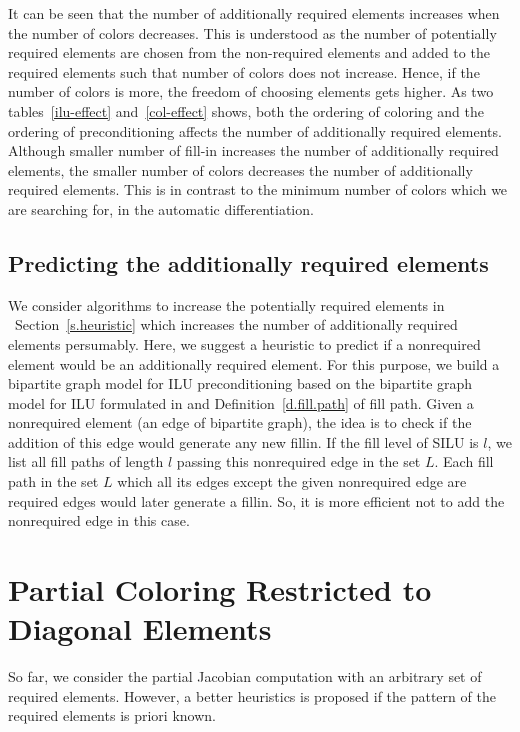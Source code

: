 \documentclass[11pt, twoside,a4paper]{book}
\newcommand{\secref}[1]{Section~\protect\ref{#1}}
\newcommand{\defref}[1]{Definition~\protect\ref{#1}}
\begin{document}
It can be seen that the number of additionally required elements increases when
the number of colors decreases. This is understood as the number of potentially
required elements are chosen from the non-required elements and added to the required elements
such that number of colors does not increase. Hence, if the number of colors is more,
the freedom of choosing elements gets higher.
As two tables~\ref{ilu-effect} and~\ref{col-effect} shows,
both the ordering of coloring and the ordering of preconditioning affects the number of
additionally required elements. Although smaller number of fill-in increases
the number of additionally required elements, the smaller number of colors
decreases the number of additionally required elements.
This is in contrast to the minimum number of colors which we are searching for,
in the automatic differentiation.

\subsection{Predicting the additionally required elements}
We consider algorithms to increase the potentially required elements in
~\secref{s.heuristic} which increases the number of additionally required elements
persumably. Here, we suggest a heuristic to predict if a nonrequired element would be an
additionally required element. For this purpose, we build a bipartite graph model
for ILU preconditioning based on the bipartite graph model for ILU formulated in \cite{Lulfesmann2012Fap}
and \defref{d.fill.path} of fill path. Given a nonrequired element (an edge of bipartite graph),
the idea is to check if the addition of this edge would generate any new fillin.
If the fill level of SILU is $l$, we list all fill paths of length $l$ passing this nonrequired edge 
in the set $L$. Each fill path in the set $L$ which all its edges except the given nonrequired edge
are required edges would later generate a fillin. So, it is more efficient not to add the 
nonrequired edge in this case.


\section{Partial Coloring Restricted to Diagonal Elements}
So far, we consider the partial Jacobian computation with an arbitrary
set of required elements. However, a better heuristics is proposed if the
pattern of the required elements is priori known.
\end{document}

